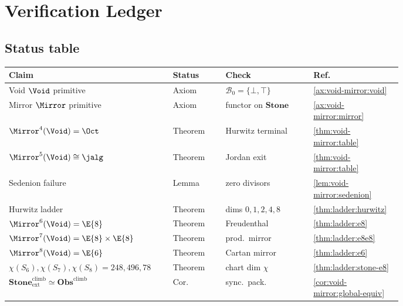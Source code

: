 \section{Verification Ledger}
\label{sec:verification}

\subsection{Status table}
\label{sec:verification:ledger}

\begin{table}[ht]
\centering
\small
\renewcommand{\arraystretch}{1.15}
\begin{tabular}{@{}p{0.30\linewidth}p{0.12\linewidth}p{0.20\linewidth}p{0.16\linewidth}@{}}
\toprule
\textbf{Claim} & \textbf{Status} & \textbf{Check} & \textbf{Ref.} \\
\midrule
Void $\Void$ primitive & Axiom & $\mathcal{B}_0=\{\bot,\top\}$ & \ref{ax:void-mirror:void} \\
Mirror $\Mirror$ primitive & Axiom & functor on $\mathbf{Stone}$ & \ref{ax:void-mirror:mirror} \\
$\Mirror^4(\Void)=\Oct$ & Theorem & Hurwitz terminal & \ref{thm:void-mirror:table} \\
$\Mirror^5(\Void)\cong\jalg$ & Theorem & Jordan exit & \ref{thm:void-mirror:table} \\
Sedenion failure & Lemma & zero divisors & \ref{lem:void-mirror:sedenion} \\
Hurwitz ladder & Theorem & dims $0,1,2,4,8$ & \ref{thm:ladder:hurwitz} \\
$\Mirror^6(\Void)=\E{8}$ & Theorem & Freudenthal & \ref{thm:ladder:e8} \\
$\Mirror^7(\Void)=\E{8}\times\E{8}$ & Theorem & prod.\ mirror & \ref{thm:ladder:e8e8} \\
$\Mirror^8(\Void)=\E{6}$ & Theorem & Cartan mirror & \ref{thm:ladder:e6} \\
$\chi(S_6),\chi(S_7),\chi(S_8)=248,496,78$ & Theorem & chart dim $\chi$ & \ref{thm:ladder:stone-e8} \\
$\mathbf{Stone}^{\mathrm{climb}}_{\mathrm{ext}}\simeq\mathbf{Obs}^{\mathrm{climb}}$ & Cor. & sync.\ pack. & \ref{cor:void-mirror:global-equiv} \\

\end{tabular}
\end{table}
